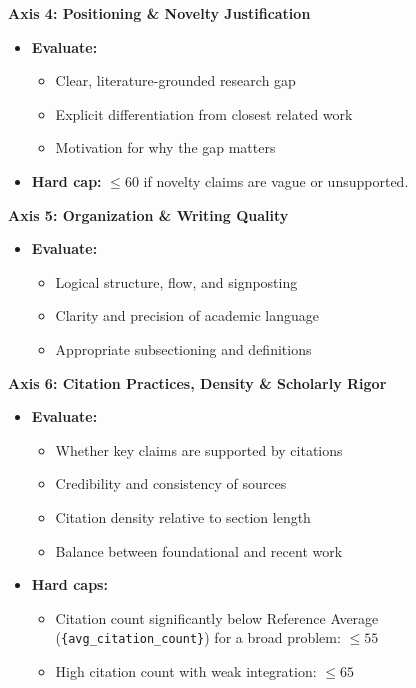\vspace{0.5em}
\noindent\textbf{Axis 4: Positioning \& Novelty Justification}
\begin{itemize}
    \item \textbf{Evaluate:}
    \begin{itemize}
        \item Clear, literature-grounded research gap
        \item Explicit differentiation from closest related work
        \item Motivation for why the gap matters
    \end{itemize}
    \item \textbf{Hard cap:} $\leq 60$ if novelty claims are vague or unsupported.
\end{itemize}

\vspace{0.5em}
\noindent\textbf{Axis 5: Organization \& Writing Quality}
\begin{itemize}
    \item \textbf{Evaluate:}
    \begin{itemize}
        \item Logical structure, flow, and signposting
        \item Clarity and precision of academic language
        \item Appropriate subsectioning and definitions
    \end{itemize}
\end{itemize}

\vspace{0.5em}
\noindent\textbf{Axis 6: Citation Practices, Density \& Scholarly Rigor}
\begin{itemize}
    \item \textbf{Evaluate:}
    \begin{itemize}
        \item Whether key claims are supported by citations
        \item Credibility and consistency of sources
        \item Citation density relative to section length
        \item Balance between foundational and recent work
    \end{itemize}
    \item \textbf{Hard caps:}
    \begin{itemize}
        \item Citation count significantly below Reference Average (\texttt{\{avg\_citation\_count\}}) for a broad problem: $\leq 55$
        \item High citation count with weak integration: $\leq 65$
    \end{itemize}
\end{itemize}

